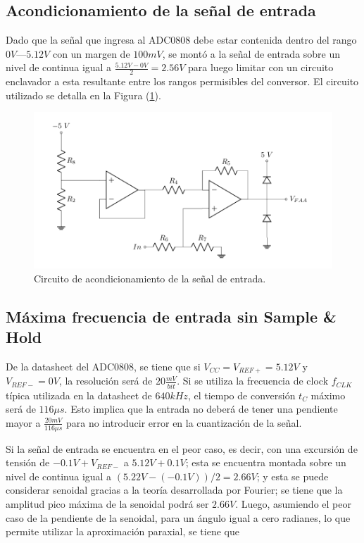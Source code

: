 \subsection{Acondicionamiento de la señal de entrada}

Dado que la señal que ingresa al ADC0808 debe estar contenida dentro del rango $0V$—$5.12V$ con un margen de $100mV$, se montó a la señal de entrada sobre un nivel de continua igual a $\frac{5.12V - 0V}{2} = 2.56V$ para luego limitar con un circuito enclavador a esta resultante entre los rangos permisibles del conversor. El circuito utilizado se detalla en la Figura (\ref{ACOND}).

\begin{figure}[H]
\centering
\includegraphics[width=0.8\linewidth]{ImagenesEjercicio1/ada.pdf}
\caption{Circuito de acondicionamiento de la señal de entrada.}
\label{ACOND}
\end{figure}

\subsection{Máxima frecuencia de entrada sin Sample \& Hold}

De la datasheet del ADC0808, se tiene que si $V_{CC} = V_{REF+} = 5.12V$ y $V_{REF-} = 0V$, la resolución será de $20 \frac{mV}{bit}$. Si se utiliza la frecuencia de clock $f_{CLK}$ típica utilizada en la datasheet de $640kHz$, el tiempo de conversión $t_C$ máximo será de $116\mu s$. Esto implica que la entrada no deberá de tener una pendiente mayor a $\frac{20mV}{116\mu s}$ para no introducir error en la cuantización de la señal.


Si la señal de entrada se encuentra en el peor caso, es decir, con una excursión de tensión de $-0.1V + V_{REF-}$ a $5.12V + 0.1V$; esta se encuentra montada sobre un nivel de continua igual a $(5.22V - (-0.1V))/2 = 2.66V$; y esta se puede considerar senoidal gracias a la teoría desarrollada por Fourier; se tiene que la amplitud pico máxima de la senoidal podrá ser $2.66V$. Luego, asumiendo el peor caso de la pendiente de la senoidal, para un ángulo igual a cero radianes, lo que permite utilizar la aproximación paraxial, se tiene que
\\

